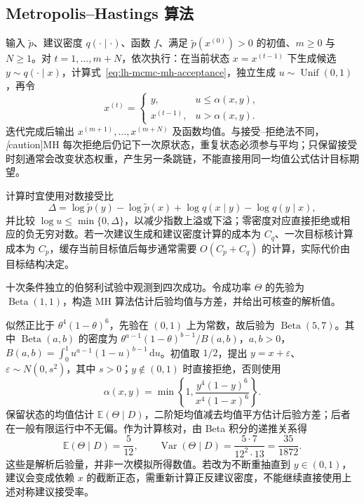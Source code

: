 \subsection{Metropolis--Hastings 算法}
\label{subsec:lh-mcmc-mh-algorithm}

输入 $\widetilde p$、建议密度 $q(\cdot\mid\cdot)$、函数 $f$、满足 $\widetilde p(x^{(0)})>0$ 的初值、$m\geq0$ 与 $N\geq1$。对 $t=1,\ldots,m+N$，依次执行：在当前状态 $x=x^{(t-1)}$ 下生成候选 $y\sim q(\cdot\mid x)$，计算式~\eqref{eq:lh-mcmc-mh-acceptance}，独立生成 $u\sim\operatorname{Unif}(0,1)$，再令
\begin{equation}
x^{(t)}=\begin{cases}
y,&u\leq\alpha(x,y),\\
x^{(t-1)},&u>\alpha(x,y).
\end{cases}
\label{eq:lh-mcmc-mh-update}
\end{equation}
迭代完成后输出 $x^{(m+1)},\ldots,x^{(m+N)}$ 及函数均值。与接受--拒绝法不同，\emph[caution]{MH 每次拒绝后仍记下一次原状态，重复状态必须参与平均}；只保留接受时刻通常会改变状态权重，产生另一条跳链，不能直接用同一均值公式估计目标期望。

计算时宜使用对数接受比
\[
\Delta=\log\widetilde p(y)-\log\widetilde p(x)
+\log q(x\mid y)-\log q(y\mid x),
\]
并比较 $\log u\leq\min\{0,\Delta\}$，以减少指数上溢或下溢；零密度对应直接拒绝或相应的负无穷对数。若一次建议生成和建议密度计算的成本为 $C_q$、一次目标核计算成本为 $C_p$，缓存当前目标值后每步通常需要 $O(C_p+C_q)$ 的计算，实际代价由目标结构决定。

\begin{example}
\label{ex:lh-mcmc-beta-posterior}
十次条件独立的伯努利试验中观测到四次成功。令成功率 $\Theta$ 的先验为 $\operatorname{Beta}(1,1)$，构造 MH 算法估计后验均值与方差，并给出可核查的解析值。
\end{example}
\begin{solve}
似然正比于 $\theta^4(1-\theta)^6$，先验在 $(0,1)$ 上为常数，故后验为 $\operatorname{Beta}(5,7)$。其中 $\operatorname{Beta}(a,b)$ 的密度为 $\theta^{a-1}(1-\theta)^{b-1}/B(a,b)$，$a,b>0$，$B(a,b)=\int_0^1u^{a-1}(1-u)^{b-1}\,\mathrm du$。初值取 $1/2$，提出 $y=x+\varepsilon$、$\varepsilon\sim N(0,s^2)$，其中 $s>0$；$y\notin(0,1)$ 时直接拒绝，否则使用
\[
\alpha(x,y)=\min\left\{1,
\frac{y^4(1-y)^6}{x^4(1-x)^6}\right\}.
\]
保留状态的均值估计 $\mathbb E(\Theta\mid D)$，二阶矩均值减去均值平方估计后验方差；后者在一般有限运行中不无偏。作为计算核对，由 Beta 积分的递推关系得
\[
\mathbb E(\Theta\mid D)=\frac5{12},\qquad
\operatorname{Var}(\Theta\mid D)=\frac{5\cdot7}{12^2\cdot13}=\frac{35}{1872}.
\]
这些是解析后验量，并非一次模拟所得数值。若改为不断重抽直到 $y\in(0,1)$，建议会变成依赖 $x$ 的截断正态，需重新计算正反建议密度，不能继续直接使用上述对称建议接受率。
\end{solve}

